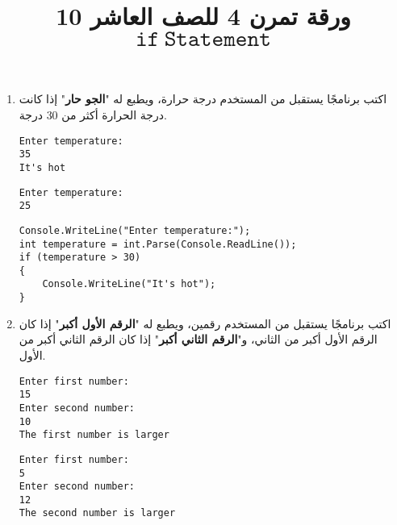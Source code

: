 ﻿\documentclass[12pt]{article}
\title{ورقة تمرن 4 للصف العاشر 10 $\mathtt{if\ Statement}$}
\begin{document}
\maketitle
\thispagestyle{fancy}

\ifdetailed
\begin{enumerate}[itemsep=3em]
\else
\begin{enumerate}
\fi


\item
اكتب برنامجًا يستقبل من المستخدم درجة حرارة، ويطبع له "\textbf{الجو حار}" إذا كانت درجة الحرارة أكثر من 30 درجة.
\ifdetailed
\begin{boxExample}[1]
\begin{english}
\begin{verbatim}
Enter temperature:
35
It's hot
\end{verbatim}
\end{english}
\end{boxExample}

\begin{boxExample}[2]
\begin{english}
\begin{verbatim}
Enter temperature:
25
\end{verbatim}
\end{english}
\end{boxExample}

\ifwithsols
\begin{boxSolution}
\begin{english}
\begin{verbatim}
Console.WriteLine("Enter temperature:");
int temperature = int.Parse(Console.ReadLine());
if (temperature > 30)
{
    Console.WriteLine("It's hot");
}

\end{verbatim}
\end{english}
\end{boxSolution}
\clearpage
\fi
\fi

\item
اكتب برنامجًا يستقبل من المستخدم رقمين، ويطبع له "\textbf{الرقم الأول أكبر}" إذا كان الرقم الأول أكبر من الثاني، و"\textbf{الرقم الثاني أكبر}" إذا كان الرقم الثاني أكبر من الأول.
\ifdetailed
\begin{boxExample}[1]
\begin{english}
\begin{verbatim}
Enter first number:
15
Enter second number:
10
The first number is larger
\end{verbatim}
\end{english}
\end{boxExample}
\begin{boxExample}[2]
\begin{english}
\begin{verbatim}
Enter first number:
5
Enter second number:
12
The second number is larger
\end{verbatim}
\end{english}
\end{boxExample}


\end{enumerate}
\end{enumerate}
\end{document}
